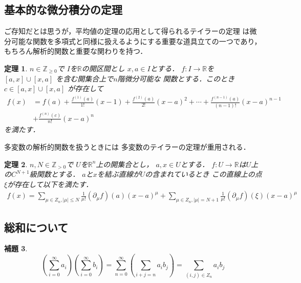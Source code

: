 \documentclass[leqno, a4paper, 12pt]{jsarticle}
\newtheorem{thm}{定理}
\newtheorem{lem}[thm]{補題}
\newcommand{\zz}{\mathbb{Z}}
\newcommand{\rr}{\mathbb{R}}
\begin{document}
\subsection{基本的な微分積分の定理}
ご存知だとは思うが，平均値の定理の応用として得られるテイラーの定理
は微分可能な関数を多項式と同様に扱えるようにする重要な道具立ての一つであり，
もちろん解析的関数と重要な関わりを持つ．
\begin{thm}
$n\in \zz_{\ge 0}$で
$I$を$\rr$の開区間とし
$x, a\in I$とする．
$f: I\to \rr$を
$[a, x]\cup [x, a]$
を含む開集合上で$n$階微分可能な
関数とする．このとき
$c\in [a, x]\cup [x, a]$
が存在して
\begin{align*}
f(x)&=f(a)+\frac{f^{(1)}(a)}{1!}(x-1)+\frac{f^{(2)}(a)}{2!}(x-a)^2+
\cdots +
\frac{f^{(n-1)}(a)}{(n-1)!}(x-a)^{n-1}\\
&+\frac{f^{(n)}(c)}{n!}(x-a)^n
\end{align*}
を満たす．
\end{thm}
多変数の解析的関数を扱うときには
多変数のテイラーの定理が重用される．

\begin{thm}
$n, N\in \zz_{>0}$で
$U$を$\rr^n$上の開集合とし，
$a, x\in U$とする．
$f: U\to \rr$は$U$上の$C^{N+1}$級関数とする．
$a$と$x$を結ぶ直線が$U$の含まれているとき
この直線上の点$\xi$が存在して以下を満たす．
\begin{align*}
f(x)=\sum_{\mu\in Z_n, |\mu|\le N}\frac{1}{\mu!}(\partial_{\mu}f)(a)(x-a)^{\mu}
+\sum_{\mu\in Z_n, |\mu|=N+1}\frac{1}{\mu!}(\partial_{\mu}f)(\xi)(x-a)^{\mu}
\end{align*}
\end{thm}

\subsection{総和について}
\begin{lem}
\[
\left(\sum_{i=0}^{\infty}a_i\right)\left(\sum_{i=0}^{\infty}b_i\right)
=\sum_{n=0}^{\infty}\left(\sum_{i+j=n}a_ib_j\right)
=
\sum_{(i, j)\in Z_n}a_ib_j
\]
\end{lem}
\end{document}
